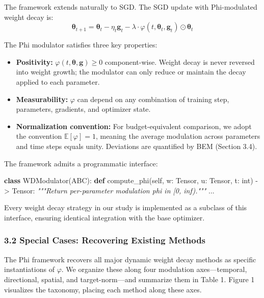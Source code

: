 \documentclass[
]{article}
\newenvironment{Shaded}{}{}
\newcommand{\BuiltInTok}[1]{\textcolor[rgb]{0.00,0.50,0.00}{#1}}
\newcommand{\CommentTok}[1]{\textcolor[rgb]{0.38,0.63,0.69}{\textit{#1}}}
\newcommand{\KeywordTok}[1]{\textcolor[rgb]{0.00,0.44,0.13}{\textbf{#1}}}
\newcommand{\NormalTok}[1]{#1}
\newcommand{\OperatorTok}[1]{\textcolor[rgb]{0.40,0.40,0.40}{#1}}
\newcommand{\VariableTok}[1]{\textcolor[rgb]{0.10,0.09,0.49}{#1}}
\providecommand{\tightlist}{%
  \setlength{\itemsep}{0pt}\setlength{\parskip}{0pt}}
\begin{document}
The framework extends naturally to SGD. The SGD update with
Phi-modulated weight decay is: \[
\boldsymbol{\theta}_{t+1} = \boldsymbol{\theta}_t - \eta_t \mathbf{g}_t - \lambda \cdot \varphi(t, \boldsymbol{\theta}_t, \mathbf{g}_t) \odot \boldsymbol{\theta}_t
\]

The Phi modulator satisfies three key properties:

\begin{itemize}
\tightlist
\item
  \textbf{Positivity:}
  \(\varphi(t, \boldsymbol{\theta}, \mathbf{g}) \geq 0\) component-wise.
  Weight decay is never reversed into weight growth; the modulator can
  only reduce or maintain the decay applied to each parameter.
\item
  \textbf{Measurability:} \(\varphi\) can depend on any combination of
  training step, parameters, gradients, and optimizer state.
\item
  \textbf{Normalization convention:} For budget-equivalent comparison,
  we adopt the convention \(\mathbb{E}[\varphi] = 1\), meaning the
  average modulation across parameters and time steps equals unity.
  Deviations are quantified by BEM (Section 3.4).
\end{itemize}

The framework admits a programmatic interface:

\begin{Shaded}
\begin{Highlighting}[]
\KeywordTok{class}\NormalTok{ WDModulator(ABC):}
    \KeywordTok{def}\NormalTok{ compute\_phi(}\VariableTok{self}\NormalTok{, w: Tensor, u: Tensor, t: }\BuiltInTok{int}\NormalTok{) }\OperatorTok{{-}\textgreater{}}\NormalTok{ Tensor:}
        \CommentTok{"""Return per{-}parameter modulation phi in [0, inf)."""}
\NormalTok{        ...}
\end{Highlighting}
\end{Shaded}

Every weight decay strategy in our study is implemented as a subclass of
this interface, ensuring identical integration with the base optimizer.

\hypertarget{special-cases-recovering-existing-methods}{%
\subsubsection{3.2 Special Cases: Recovering Existing
Methods}\label{special-cases-recovering-existing-methods}}

The Phi framework recovers all major dynamic weight decay methods as
specific instantiations of \(\varphi\). We organize these along four
modulation axes---temporal, directional, spatial, and target-norm---and
summarize them in Table 1. Figure 1 visualizes the taxonomy, placing
each method along these axes.
\end{document}
